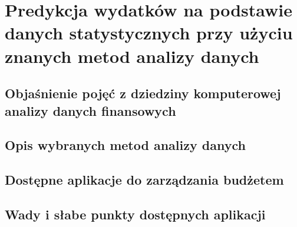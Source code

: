 \chapter{Predykcja wydatków na podstawie danych statystycznych przy użyciu znanych metod analizy danych}
\section{Objaśnienie pojęć z dziedziny komputerowej analizy danych finansowych}
\section{Opis wybranych metod analizy danych}
\section{Dostępne aplikacje do zarządzania budżetem}
\section{Wady i słabe punkty dostępnych aplikacji}